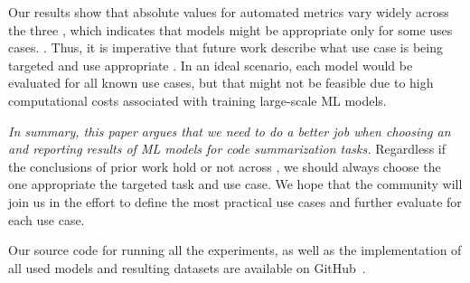 Our results show that absolute values for automated metrics vary
widely across the three \methodologies, which indicates that models
might be appropriate only for some uses cases.  .  Thus, it is
imperative that future work describe what use case is being targeted
and use appropriate \methodology.  In an ideal scenario, each model
would be evaluated for all known use cases, but that might not be
feasible due to high computational costs associated with training 
large-scale ML models.






\emph{In summary, this paper argues that we need to do a better job
  when choosing an \emethodology and reporting results of ML models for
  code summarization tasks.}  Regardless if the conclusions of prior
work hold or not across \methodologies, we should always choose the
one appropriate the targeted task and use case.  We hope that the
community will join us in the effort to define the most practical use
cases and further evaluate \methodologies for each use case.

Our source code for running all the experiments, as well as the
implementation of all used models and resulting datasets are available
on GitHub~\cite{URLOncePaperIsAccepted}.


